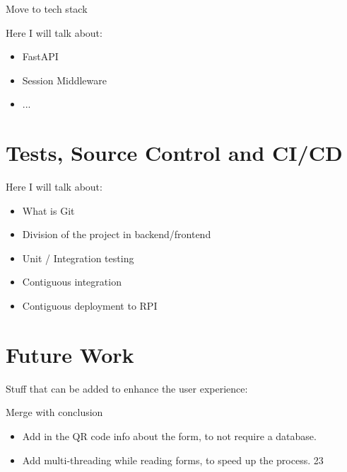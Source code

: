\documentclass[12pt, a4paper]{report}
\begin{document}
Move to tech stack

Here I will talk about:
\begin{itemize}
    \item FastAPI
    \item Session Middleware
    \item ...
\end{itemize}


\chapter{Tests, Source Control and CI/CD}

Here I will talk about:
\begin{itemize}
    \item What is Git
    \item Division of the project in backend/frontend
    \item Unit / Integration testing
    \item Contiguous integration
    \item Contiguous deployment to RPI
\end{itemize}

\chapter{Future Work}

Stuff that can be added to enhance the user experience:

Merge with conclusion

\begin{itemize}
    \item Add in the QR code info about the form, to not require a database.
    \item Add multi-threading while reading forms, to speed up the process. 23
\end{itemize}


\printbibliography
\end{document}
